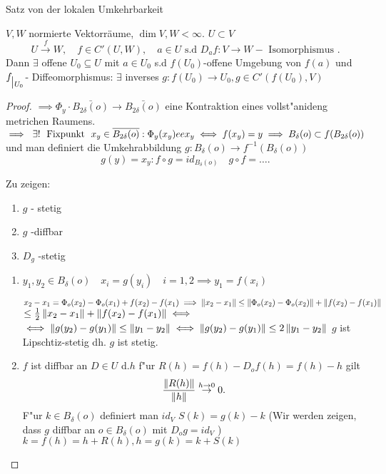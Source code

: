 \documentclass[class=article, crop=false]{standalone}
\begin{document}
\begin{zettel}{Satz von der lokalen Umkehrbarkeit}

\begin{flashcard}
	\begin{theorem}
		$V,W$ normierte Vektorräume, $\dim V,W < \infty$.  $U \subset V$
		\[
			U \stackrel{f}{\to} W,\quad f \in C'(U,W),\quad a \in U \text{ s.d } D_af: V \to W - \text{ Isomorphismus }
		.\]
		Dann $\exists $ offene $U_0 \subseteq U$ mit $a \in U_0$ s.d $f( U_0 ) $-offene Umgebung von $f( a ) $ und $f _{\big{|_{U_0}}} $- Diffeomorphismus: $\exists $ inverses $g : f( U_0 ) \to U_0, g \in C'(f(U_0),V) $
	\end{theorem}
\end{flashcard}

\begin{proof}
	$\implies \Phi_y \cdot  \bar{B_{2\delta}(o)} \to  \bar{B_{2\delta}(o)}$ eine Kontraktion eines vollst"anideng metrichen Raumens. $\implies  \exists ! \tx{ Fixpunkt } x_y \in \bar{B_{2\delta}(o)}: \Phi_y(x_y) ee x_y \iff  f(x_y)= y \implies  B_{\delta}(o) \subset  f (B_{2\delta}(o)) $ und man definiert die Umkehrabbildung $g: B_{\delta}(o) \to  f^{-1}(B_{\delta}(o))$
	\[
		g(y) = x_y: f \circ  g = id_{B_{\delta}(o)} \quad g \circ  f = \dots
	.\]

	Zu zeigen:
	\begin{enumerate}
		\item $g$ - stetig
		\item $g$ -diffbar
		\item $D_g$ -stetig
	\end{enumerate}

	\begin{enumerate}
		\item $y_1, y_2 \in  B_{\delta}(o) \quad x_i = g(y_i) \quad i =1,2 \implies y_1 = f(x_i)$

		      $x_2 - x_1 = \Phi_o(x_2) - \Phi_o(x_1) + f(x_2) - f(x_1) \implies \left\|x_2 - x_1\right\| \leq  \left\|\Phi_o(x_2) - \Phi_o(x_2)\right\| + \left\| f(x_2) - f(x_1)\right\|$ $\leq  \frac{1}{2} \left\|x_2-x_1\right\| + \left\| f(x_2) - f(x_1)\right\| \iff $
		      $\iff \left\|g(y_2) - g(y_1)\right\| \leq  \left\|y_1 - y_2\right\| \iff \left\|g(y_2) - g(y_1)\right\| \leq 2\left\|y_1-y_2\right\|$
		      $g$ ist Lipschtiz-stetig dh. $g$ ist stetig.

		\item $f$ ist diffbar an $D \in  U$ d.$h$ f"ur $R(h) = f(h) - D_o f(h) = f(h) - h$  gilt
		      \[
			      \frac{\left\|R(h)\right\|}{\left\|h\right\|} \stackrel{h \to  0}{\to} 0
		      .\]
		      F"ur $k \in  B_{\delta}(o)$ definiert man $id_V$ $S(k) = g(k) - k $
		      (Wir werden zeigen, dass $g$ diffbar an $o \in  B_{\delta}(o)$ mit $D_o g = id_V$ )\\
		      $k = f(h) = h + R(h), h = g(k) = k + S(k)$


\end{enumerate}
\end{proof}
\end{zettel}
\end{document}
